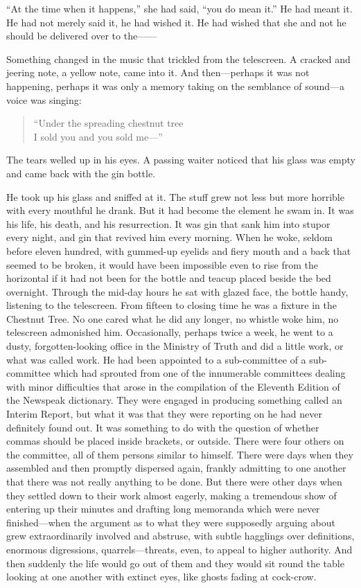 ``At the time when it happens,'' she had said, ``you do mean it.'' He had
meant it. He had not merely said it, he had wished it. He had wished
that she and not he should be delivered over to the------

Something changed in the music that trickled from the telescreen. A
cracked and jeering note, a yellow note, came into it. And
then---perhaps it was not happening, perhaps it was only a memory taking
on the semblance of sound---a voice was singing:

\begin{quotation}
  ``Under the spreading chestnut tree\\
  I sold you and you sold me---''\\
\end{quotation}

The tears welled up in his eyes. A passing waiter noticed that his glass
was empty and came back with the gin bottle.

He took up his glass and sniffed at it. The stuff grew not less but more
horrible with every mouthful he drank. But it had become the element he
swam in. It was his life, his death, and his resurrection. It was gin
that sank him into stupor every night, and gin that revived him every
morning. When he woke, seldom before eleven hundred, with gummed-up
eyelids and fiery mouth and a back that seemed to be broken, it would
have been impossible even to rise from the horizontal if it had not been
for the bottle and teacup placed beside the bed overnight. Through the
mid-day hours he sat with glazed face, the bottle handy, listening to
the telescreen. From fifteen to closing time he was a fixture in the
Chestnut Tree. No one cared what he did any longer, no whistle woke him,
no telescreen admonished him. Occasionally, perhaps twice a week, he
went to a dusty, forgotten-looking office in the Ministry of Truth and
did a little work, or what was called work. He had been appointed to a
sub-committee of a sub-committee which had sprouted from one of the
innumerable committees dealing with minor difficulties that arose in the
compilation of the Eleventh Edition of the Newspeak dictionary. They
were engaged in producing something called an Interim Report, but what
it was that they were reporting on he had never definitely found out. It
was something to do with the question of whether commas should be placed
inside brackets, or outside. There were four others on the committee,
all of them persons similar to himself. There were days when they
assembled and then promptly dispersed again, frankly admitting to one
another that there was not really anything to be done. But there were
other days when they settled down to their work almost eagerly, making a
tremendous show of entering up their minutes and drafting long memoranda
which were never finished---when the argument as to what they were
supposedly arguing about grew extraordinarily involved and abstruse,
with subtle hagglings over definitions, enormous digressions,
quarrels---threats, even, to appeal to higher authority. And then
suddenly the life would go out of them and they would sit round the
table looking at one another with extinct eyes, like ghosts fading at
cock-crow.

